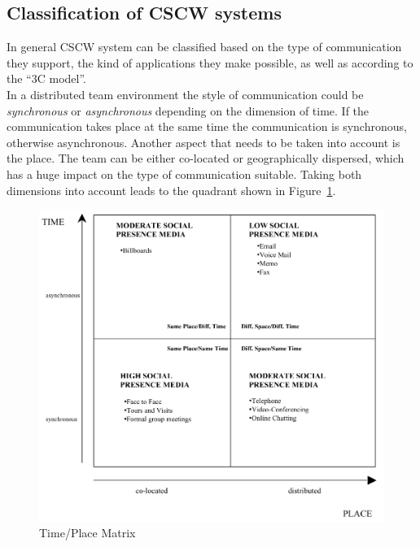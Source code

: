 
\subsection{Classification of \gls{CSCW} systems}
\label{sec:cscw_types}

In general \gls{CSCW} system can be classified based on the type of communication they support, the kind of applications they make possible, as well as according to the ``3C model''. \\

In a distributed team environment the style of communication could be \emph{synchronous} or \emph{asynchronous} depending on the dimension of time. If the communication takes place at the same time the communication is synchronous, otherwise asynchronous. Another aspect that needs to be taken into account is the place. The team can be either co-located or geographically dispersed, which has a huge impact on the type of communication suitable. Taking both dimensions into account leads to the quadrant shown in Figure~\ref{fig:images_cscw_time_place_matrix}. \\

\begin{figure}[!ht]
 \centering
 \includegraphics[width=0.9\columnwidth]{images/time_place_matrix.png}
 \caption[Time/Place Matrix]{Time/Place Matrix \citep{robert2005paradox}}
\label{fig:images_cscw_time_place_matrix}
\end{figure}

